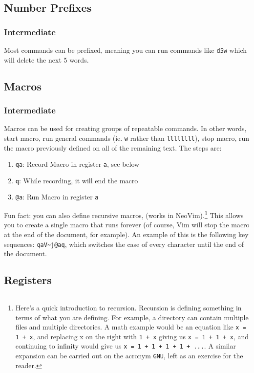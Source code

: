 \documentclass[11pt]{article}
\begin{document}
\subsection{Number Prefixes}
\label{sec:orgc1cda21}
\subsubsection{Intermediate}
\label{sec:orgcc6dced}
Most commands can be prefixed, meaning you can run commands like \texttt{d5w} which
will delete the next 5 words.
\subsection{Macros}
\label{sec:orge168b06}
\subsubsection{Intermediate}
\label{sec:org67ec758}
Macros can be used for creating groups of repeatable commands. In other words,
start macro, run general commands (ie. \texttt{w} rather than \texttt{llllllll}), stop macro,
run the macro previously defined on all of the remaining text. The steps are:

\begin{enumerate}
\item \texttt{qa}: Record Macro in register \texttt{a}, see below
\item \texttt{q}: While recording, it will end the macro
\item \texttt{@a}: Run Macro in register \texttt{a}
\end{enumerate}

Fun fact: you can also define recursive macros, (works in NeoVim).\footnote{Here's a quick introduction to recursion. Recursion is defining something
in terms of what you are defining. For example, a directory can contain multiple
files and multiple directories. A math example would be an equation like \texttt{x =
1 + x}, and replacing x on the right with \texttt{1 + x} giving us \texttt{x = 1 + 1 + x}, and
continuing to infinity would give us \texttt{x = 1 + 1 + 1 + 1 + ...}. A similar
expansion can be carried out on the acronym \texttt{GNU}, left as an exercise for the
reader.} This
allows you to create a single macro that runs forever (of course, Vim will stop
the macro at the end of the document, for example). An example of this is the
following key sequences: \texttt{qaV\textasciitilde{}j@aq}, which switches the case of every character
until the end of the document.
\subsection{Registers}
\label{sec:org504d76b}
\end{document}
